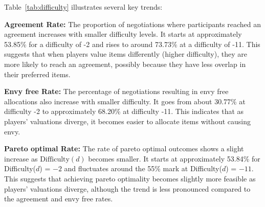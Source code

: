 \begin{table}[!ht]
    \centering
    \caption{Percentage of datapoints where humans achieve agreement, envy free allocations, pareto optimal allocations, and allocations that are both envy free and pareto optimal with different levels of difficulty.}
    \label{tab:difficulty}
\end{table}

Table~\ref{tab:difficulty} illustrates several key trends:

\textbf{Agreement Rate:} The proportion of negotiations where participants reached an agreement increases with smaller difficulty levels. It starts at approximately 53.85\% for a difficulty of -2 and rises to around 73.73\% at a difficulty of -11. This suggests that when players value items differently (higher difficulty), they are more likely to reach an agreement, possibly because they have less overlap in their preferred items.

\textbf{Envy free Rate:} The percentage of negotiations resulting in envy free allocations also increase with smaller difficulty. It goes from about 30.77\% at difficulty -2 to approximately 68.20\% at difficulty -11. This indicates that as players' valuations diverge, it becomes easier to allocate items without causing envy.

\textbf{Pareto optimal Rate:} The rate of pareto optimal outcomes shows a slight increase as $\text{Difficulty}(d)$ becomes smaller. It starts at approximately 53.84\% for Difficulty($d$) = $-2$ and fluctuates around the 55\% mark at Difficulty($d$) = $-11$. This suggests that achieving pareto optimality becomes slightly more feasible as players' valuations diverge, although the trend is less pronounced compared to the agreement and envy free rates.

